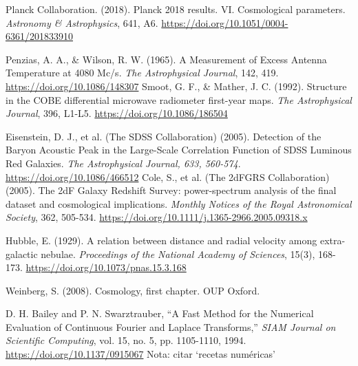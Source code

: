 
\begin{thebibliography}{999}
	 Planck Collaboration. (2018). Planck 2018 results. VI\@. Cosmological parameters. \textit{Astronomy \& Astrophysics}, 641, A6. \url{https://doi.org/10.1051/0004-6361/201833910}

	 Penzias, A. A., \& Wilson, R. W. (1965). A Measurement of Excess Antenna Temperature at 4080 Mc/s. \textit{The Astrophysical Journal}, 142, 419. \url{https://doi.org/10.1086/148307}
 Smoot, G. F., \& Mather, J. C. (1992). Structure in the COBE differential microwave radiometer first-year maps. \textit{The Astrophysical Journal}, 396, L1-L5. \url{https://doi.org/10.1086/186504}

	 Eisenstein, D. J., et al. (The SDSS Collaboration) (2005). Detection of the Baryon Acoustic Peak in the Large-Scale Correlation Function of SDSS Luminous Red Galaxies. \textit{The Astrophysical Journal, 633, 560-574}. \url{https://doi.org/10.1086/466512}
	 Cole, S., et al. (The 2dFGRS Collaboration) (2005). The 2dF Galaxy Redshift Survey: power-spectrum analysis of the final dataset and cosmological implications. \textit{Monthly Notices of the Royal Astronomical Society}, 362, 505-534. \url{https://doi.org/10.1111/j.1365-2966.2005.09318.x}



 Hubble, E. (1929). A relation between distance and radial velocity among extra-galactic nebulae. \textit{Proceedings of the National Academy of Sciences}, 15(3), 168-173. \url{https://doi.org/10.1073/pnas.15.3.168}

 Weinberg, S. (2008). Cosmology, first chapter. OUP Oxford. 

D. H. Bailey and P. N. Swarztrauber, ``A Fast Method for the Numerical Evaluation of Continuous Fourier and Laplace Transforms,'' \textit{SIAM Journal on Scientific Computing}, vol. 15, no. 5, pp. 1105-1110, 1994. \url{https://doi.org/10.1137/0915067}
Nota: citar `recetas numéricas'




\end{thebibliography}
